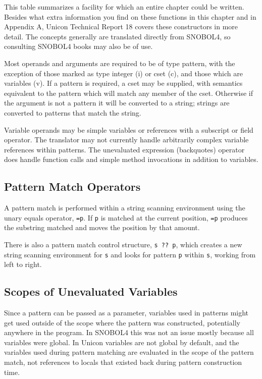 \bigskip

This table summarizes a facility for which an entire chapter could be
written. Besides what extra information you find on these functions in
this chapter and in Appendix A, Unicon Technical Report 18 covers
these constructors in more detail. The concepts generally are
translated directly from SNOBOL4, so consulting SNOBOL4 books may also
be of use.

Most operands and arguments are required to be of type pattern, with the
exception of those marked as type integer (i) or cset (c), and those
which are variables (v). If a pattern is required, a cset may be
supplied, with semantics equivalent to the pattern which will match
any member of the cset. Otherwise if the argument is not a pattern
it will be converted to a string; strings are converted to patterns
that match the string.

Variable operands may be simple variables or references with a
subscript or field operator.  The translator may not currently handle
arbitrarily complex variable references within patterns.  The
unevaluated expression (backquotes) operator does handle
function calls and simple method invocations in addition to
variables.


\subsection{Pattern Match Operators}

A pattern match is performed within a string scanning environment
using the unary equals operator, \texttt{=p}.  If \texttt{p}
is matched at the current position, \texttt{=p} produces the
substring matched and moves the position by that amount.

There is also a pattern match control structure, \texttt{s ?? p}, which creates
a new string scanning environment for \texttt{s} and looks for pattern
\texttt{p} within \texttt{s}, working from left to right.

\subsection{Scopes of Unevaluated Variables}

Since a pattern can be passed as a parameter, variables used in
patterns might get used outside of the scope where the pattern was
constructed, potentially anywhere in the program. In SNOBOL4 this was
not an issue mostly because all variables were global.  In Unicon
variables are not global by default, and the variables used
during pattern matching are evaluated in the scope of the pattern match,
not references to locals that existed back during pattern construction
time.

